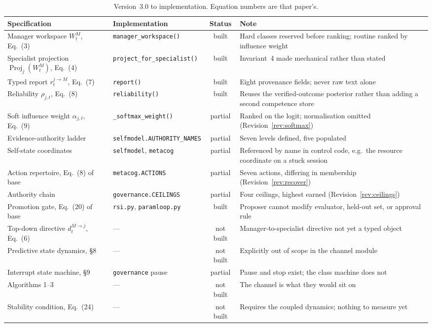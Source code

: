 \documentclass[11pt]{article}
\newcommand{\code}[1]{\texttt{\small #1}}
\newcommand{\op}[1]{\operatorname{#1}}
\begin{document}
\begin{table}[h]
\centering\small
\caption{Version~3.0 to implementation. Equation numbers are that paper's.}
\label{tab:conformance}
\begin{tabular}{@{}L{3.2cm}L{3.6cm}cL{5.1cm}@{}}
\toprule
\textbf{Specification} & \textbf{Implementation} & \textbf{Status} & \textbf{Note} \\
\midrule
Manager workspace $W^M_t$, Eq.~(3) & \code{manager\_\allowbreak{}workspace()} & built & Hard classes reserved before ranking; routine ranked by influence weight \\
Specialist projection $\op{Proj}_j(W^M_t)$, Eq.~(4) & \code{project\_\allowbreak{}for\_\allowbreak{}specialist()} & built & Invariant~4 made mechanical rather than stated \\
Typed report $r^{j\to M}_t$, Eq.~(7) & \code{report()} & built & Eight provenance fields; never raw text alone \\
Reliability $\rho_{j,t}$, Eq.~(8) & \code{reliability()} & built & Reuses the verified-outcome posterior rather than adding a second competence store \\
Soft influence weight $\alpha_{j,t}$, Eq.~(9) & \code{\_\allowbreak{}softmax\_\allowbreak{}weight()} & partial & Ranked on the logit; normalisation omitted (Revision~\ref{rev:softmax}) \\
Evidence-authority ladder & \code{selfmodel.\allowbreak{}AUTHORITY\_\allowbreak{}NAMES} & partial & Seven levels defined, five populated \\
Self-state coordinates & \code{selfmodel}, \code{metacog} & partial & Referenced by name in control code, e.g.\ the resource coordinate on a stuck session \\
Action repertoire, Eq.~(8) of base & \code{metacog.ACTIONS} & partial & Seven actions, differing in membership (Revision~\ref{rev:recover}) \\
Authority chain & \code{governance.CEILINGS} & partial & Four ceilings, highest earned (Revision~\ref{rev:ceilings}) \\
Promotion gate, Eq.~(20) of base & \code{rsi.py}, \code{paramloop.py} & built & Proposer cannot modify evaluator, held-out set, or approval rule \\
Top-down directive $d^{M\to j}_t$, Eq.~(6) & --- & not built & Manager-to-specialist directive not yet a typed object \\
Predictive state dynamics, \S8 & --- & not built & Explicitly out of scope in the channel module \\
Interrupt state machine, \S9 & \code{governance} pause & partial & Pause and stop exist; the class machine does not \\
Algorithms 1--3 & --- & not built & The channel is what they would sit on \\
Stability condition, Eq.~(24) & --- & not built & Requires the coupled dynamics; nothing to measure yet \\
\bottomrule
\end{tabular}
\end{table}
\end{document}
